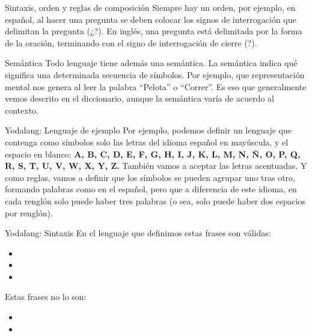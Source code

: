 
\begin{frame}{Sintaxis, orden y reglas de composición}
  Siempre hay un orden, por ejemplo, en español, al hacer una pregunta se deben
  colocar los signos de interrogación que delimitan la pregunta (¿?).
  \jump
  \jump
  En inglés, una pregunta está delimitada por la forma de la oración, terminando
  con el signo de interrogación de cierre (?).
  \jump
\end{frame}


\begin{frame}{Semántica}
  Todo lenguaje tiene además una semántica.
  \jump
  La semántica indica qué significa una determinada secuencia de símbolos.
  Por ejemplo, que representación mental nos genera al leer la palabra ``Pelota''
  o ``Correr''.
  \jump
  Es eso que generalmente vemos descrito en el diccionario, aunque la semántica
  varía de acuerdo al contexto.
\end{frame}


\begin{frame}{Yodalang: Lenguaje de ejemplo}
  Por ejemplo, podemos definir un lenguaje que contenga como símbolos solo
  las letras del idioma español en mayúscula, y el espacio en blanco:
  \jump
  \textbf{A, B, C, D, E, F, G, H, I, J, K, L, M, N, Ñ, O, P, Q, R, S, T, U, V, W, X, Y, Z.}
  \jump
  También vamos a aceptar las letras acentuadas.
  \jump
  Y como reglas, vamos a definir que los símbolos se pueden agrupar uno tras
  otro, formando palabras como en el español, pero que a diferencia de este
  idioma, en cada renglón solo puede haber tres palabras (o sea, solo puede
  haber dos espacios por renglón).
\end{frame}


\begin{frame}{Yodalang: Sintaxis}
  En el lenguaje que definimos estas frases son válidas:
  \begin{itemize}
    \item {}
    \item {}
    \item {}
  \end{itemize}
  \jump
  Estas frases no lo son:
  \begin{itemize}
    \item {}
    \item {}
  \end{itemize}
\end{frame}

